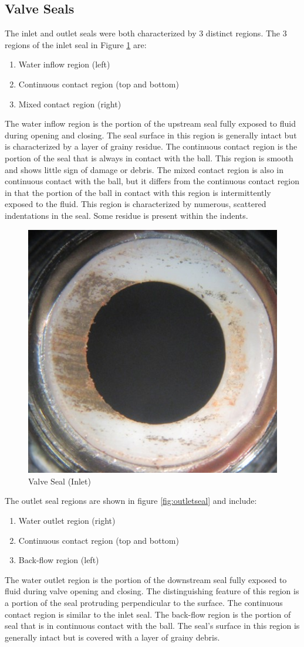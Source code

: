 \documentclass[]{article}
\begin{document}
\subsection{Valve Seals}
The inlet and outlet seals were both characterized by 3 distinct regions. The 3 regions of the inlet seal in Figure \ref{fig:inletseal} are:
\begin{enumerate}
	\item Water inflow region (left)
	\item Continuous contact region (top and bottom)
	\item Mixed contact region (right)
\end{enumerate}
The water inflow region is the portion of the upstream seal fully exposed to fluid during opening and closing. The seal surface in this region is generally intact but is characterized by a layer of grainy residue. The continuous contact region is the portion of the seal that is always in contact with the ball. This region is smooth and shows little sign of damage or debris. The mixed contact region is also in continuous contact with the ball, but it differs from the continuous contact region in that the portion of the ball in contact with this region is intermittently exposed to the fluid. This region is characterized by numerous, scattered indentations in the seal. Some residue is present within the indents.

\begin{figure}
	\centering
	\includegraphics[width=0.4\linewidth]{Photos/Inlet_Seal}
	\caption{Valve Seal (Inlet)}
	\label{fig:inletseal}
\end{figure}

The outlet seal regions are shown in figure \ref{fig:outletseal} and include:
\begin{enumerate}
	\item Water outlet region (right)
	\item Continuous contact region (top and bottom)
	\item Back-flow region (left)
\end{enumerate}
The water outlet region is the portion of the downstream seal fully exposed to fluid during valve opening and closing. The distinguishing feature of this region is a portion of the seal protruding perpendicular to the surface. The continuous contact region is similar to the inlet seal. The back-flow region is the portion of seal that is in continuous contact with the ball. The seal's surface in this region is generally intact but is covered with a layer of grainy debris. 
\end{document}
